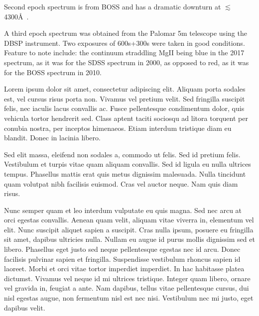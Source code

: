 \documentclass{emulateapj}
\begin{document}
Second epoch spectrum is from BOSS and has a dramatic downturn at 
$\lesssim$4300\AA\ . 

A third epoch spectrum was obtained from the Palomar 5m 
telescope using the DBSP instrument. 
Two exposures of 600s+300s were taken in good conditions. 
Feature to note include: the continuum straddling MgII
being blue in the 2017 spectrum, as it was for the SDSS spectrum in 2000, as opposed to
red, as it was for the BOSS spectrum in 2010.  

Lorem ipsum dolor sit amet, consectetur adipiscing elit. Aliquam porta
sodales est, vel cursus risus porta non. Vivamus vel pretium
velit. Sed fringilla suscipit felis, nec iaculis lacus convallis
ac. Fusce pellentesque condimentum dolor, quis vehicula tortor
hendrerit sed. Class aptent taciti sociosqu ad litora torquent per
conubia nostra, per inceptos himenaeos. Etiam interdum tristique diam
eu blandit. Donec in lacinia libero.

Sed elit massa, eleifend non sodales a, commodo ut felis. Sed id
pretium felis. Vestibulum et turpis vitae quam aliquam convallis. Sed
id ligula eu nulla ultrices tempus. Phasellus mattis erat quis metus
dignissim malesuada. Nulla tincidunt quam volutpat nibh facilisis
euismod. Cras vel auctor neque. Nam quis diam risus.

Nunc semper quam et leo interdum vulputate eu quis magna. Sed nec arcu
at orci egestas convallis. Aenean quam velit, aliquam vitae viverra
in, elementum vel elit. Nunc suscipit aliquet sapien a suscipit. Cras
nulla ipsum, posuere eu fringilla sit amet, dapibus ultricies
nulla. Nullam eu augue id purus mollis dignissim sed et
libero. Phasellus eget justo sed neque pellentesque egestas nec id
arcu. Donec facilisis pulvinar sapien et fringilla. Suspendisse
vestibulum rhoncus sapien id laoreet. Morbi et orci vitae tortor
imperdiet imperdiet. In hac habitasse platea dictumst. Vivamus vel
neque id mi ultrices tristique. Integer quam libero, ornare vel
gravida in, feugiat a ante. Nam dapibus, tellus vitae pellentesque
cursus, dui nisl egestas augue, non fermentum nisl est nec
nisi. Vestibulum nec mi justo, eget dapibus velit.



\end{document}
